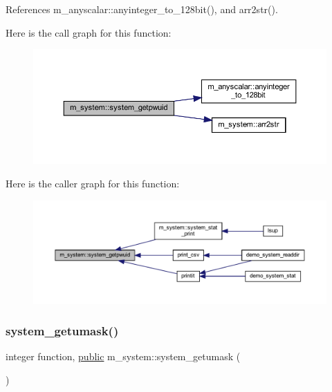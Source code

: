 References m\+\_\+anyscalar\+::anyinteger\+\_\+to\+\_\+128bit(), and arr2str().

Here is the call graph for this function\+:
\nopagebreak
\begin{figure}[H]
\begin{center}
\leavevmode
\includegraphics[width=350pt]{namespacem__system_a59cd13de95dc9a65b444f02614ea39ce_cgraph}
\end{center}
\end{figure}
Here is the caller graph for this function\+:
\nopagebreak
\begin{figure}[H]
\begin{center}
\leavevmode
\includegraphics[width=350pt]{namespacem__system_a59cd13de95dc9a65b444f02614ea39ce_icgraph}
\end{center}
\end{figure}
\mbox{\label{namespacem__system_aa9ca951be39d2ea738d627cf42c00ddd}} 
\subsubsection{\texorpdfstring{system\+\_\+getumask()}{system\_getumask()}}
{\footnotesize\ttfamily integer function, \hyperlink{M__stopwatch_83_8txt_a2f74811300c361e53b430611a7d1769f}{public} m\+\_\+system\+::system\+\_\+getumask (\begin{DoxyParamCaption}{ }\end{DoxyParamCaption})}



